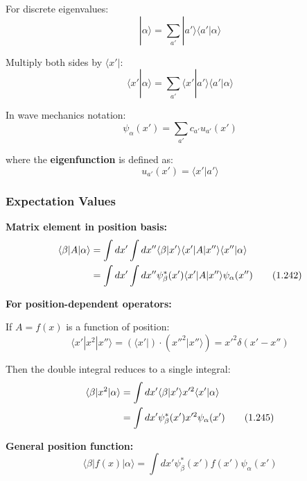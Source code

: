 \documentclass[11pt,a4paper]{article}
\begin{document}
For discrete eigenvalues:
\begin{equation}
|\alpha\rangle = \sum_{a'}|a'\rangle\langle a'|\alpha\rangle
\tag{1.239}
\end{equation}

Multiply both sides by $\langle x'|$:
\begin{equation}
\langle x'|\alpha\rangle = \sum_{a'}\langle x'|a'\rangle\langle a'|\alpha\rangle
\tag{1.240}
\end{equation}

In wave mechanics notation:
\begin{equation}
\psi_\alpha(x') = \sum_{a'}c_{a'}u_{a'}(x')
\end{equation}

where the \textbf{eigenfunction} is defined as:
\begin{equation}
u_{a'}(x') = \langle x'|a'\rangle
\tag{1.241}
\end{equation}

\subsubsection{Expectation Values}

\textbf{Matrix element in position basis:}
\begin{align}
\langle\beta|A|\alpha\rangle &= \int dx' \int dx''\langle\beta|x'\rangle\langle x'|A|x''\rangle\langle x''|\alpha\rangle \notag \\
&= \int dx' \int dx''\psi_\beta^*(x')\langle x'|A|x''\rangle\psi_\alpha(x'')
\tag{1.242}
\end{align}

\textbf{For position-dependent operators:}

If $A = f(x)$ is a function of position:
\begin{equation}
\langle x'|x^2|x''\rangle = (\langle x'|) \cdot (x''^2|x''\rangle) = x'^2\delta(x' - x'')
\tag{1.244}
\end{equation}

Then the double integral reduces to a single integral:
\begin{align}
\langle\beta|x^2|\alpha\rangle &= \int dx'\langle\beta|x'\rangle x'^2\langle x'|\alpha\rangle \notag \\
&= \int dx'\psi_\beta^*(x')x'^2\psi_\alpha(x')
\tag{1.245}
\end{align}

\textbf{General position function:}
\begin{equation}
\boxed{\langle\beta|f(x)|\alpha\rangle = \int dx'\psi_\beta^*(x')f(x')\psi_\alpha(x')}
\tag{1.246}
\end{equation}
\end{document}
